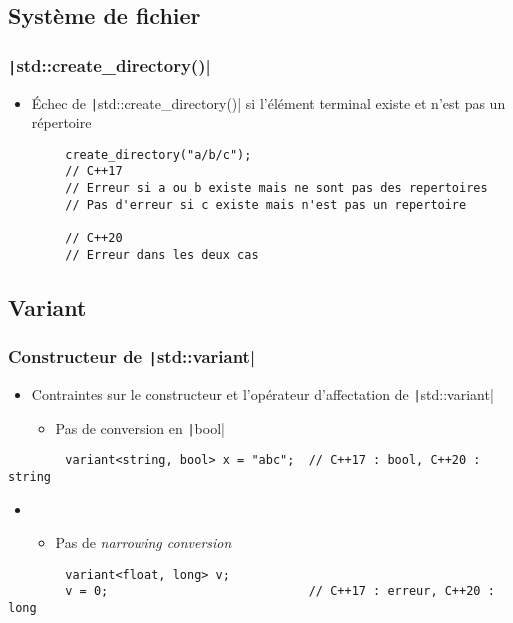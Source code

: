 \documentclass[C++.tex]{subfiles}
\begin{document}
\subsection*{Système de fichier}
\begin{frame}[fragile]
	\frametitle{\texttt|std::create_directory()|}
	\begin{itemize}
		\item Échec de \texttt|std::create_directory()| si l'élément terminal existe et n'est pas un répertoire
	\end{itemize}

	\begin{verbatim}
		create_directory("a/b/c");
		// C++17
		// Erreur si a ou b existe mais ne sont pas des repertoires
		// Pas d'erreur si c existe mais n'est pas un repertoire

		// C++20
		// Erreur dans les deux cas
	\end{verbatim}

\end{frame}

\subsection*{Variant}
\begin{frame}[fragile]
	\frametitle{Constructeur de \texttt|std::variant|}
	\begin{itemize}
		\item Contraintes sur le constructeur et l'opérateur d'affectation de \texttt|std::variant|
		\begin{itemize}
			\item Pas de conversion en \texttt|bool|
		\end{itemize}
	\end{itemize}

	\begin{verbatim}
		variant<string, bool> x = "abc";  // C++17 : bool, C++20 : string
	\end{verbatim}

	\begin{itemize}
		\item [] \begin{itemize}
			\item Pas de \textit{narrowing conversion}
		\end{itemize}
	\end{itemize}

	\begin{verbatim}
		variant<float, long> v;
		v = 0;                            // C++17 : erreur, C++20 : long
	\end{verbatim}

\end{frame}
\end{document}
